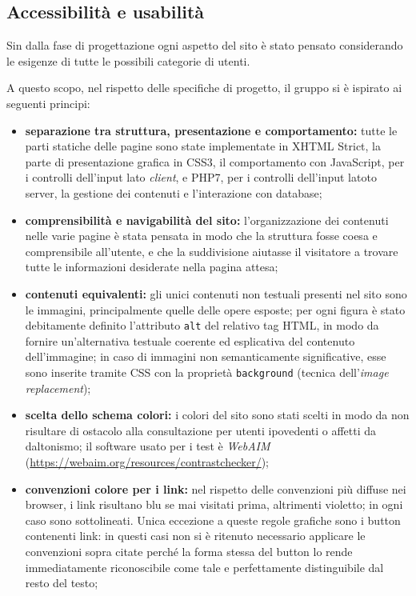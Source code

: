 \subsection{Accessibilità e usabilità}
\label{progettazione-accessibilità-usabilità}
Sin dalla fase di progettazione ogni aspetto del sito è stato pensato considerando le esigenze di tutte le possibili categorie di utenti. 


A questo scopo, nel rispetto delle specifiche di progetto, il gruppo si è ispirato ai seguenti principi:
\begin{itemize}
	\item \textbf{separazione tra struttura, presentazione e comportamento:} tutte le parti statiche delle pagine sono state implementate in XHTML Strict, la parte di presentazione grafica in CSS3, il comportamento con JavaScript, per i controlli dell'input lato \textit{client}, e PHP7, per i controlli dell'input latoto server, la gestione dei contenuti e l'interazione con database;
	
	\item \textbf{comprensibilità e navigabilità del sito:} l'organizzazione dei contenuti nelle varie pagine è stata pensata in modo che la struttura fosse coesa e comprensibile all'utente, e che la suddivisione aiutasse il visitatore a trovare tutte le informazioni desiderate nella pagina attesa;
	
	\item \textbf{contenuti equivalenti:} gli unici contenuti non testuali presenti nel sito sono le immagini, principalmente quelle delle opere esposte; per ogni figura è stato debitamente definito l'attributo \texttt{alt} del relativo tag HTML, in modo da fornire un'alternativa testuale coerente ed esplicativa del contenuto dell'immagine; in caso di immagini non semanticamente significative, esse sono inserite tramite CSS con la proprietà \texttt{background} (tecnica dell'\textit{image replacement});
	
	\item \textbf{scelta dello schema colori:} i colori del sito sono stati scelti in modo da non risultare di ostacolo alla consultazione per utenti ipovedenti o affetti da daltonismo; il software usato per i test è \textit{WebAIM} (\url{https://webaim.org/resources/contrastchecker/}); 
	
	\item \textbf{convenzioni colore per i link:} nel rispetto delle convenzioni più diffuse nei browser, i link risultano blu se mai visitati prima, altrimenti violetto; in ogni caso sono sottolineati. Unica eccezione a queste regole grafiche sono i button contenenti link: in questi casi non si è ritenuto necessario applicare le convenzioni sopra citate perché la forma stessa del button lo rende immediatamente riconoscibile come tale e perfettamente distinguibile dal resto del testo;
	

\end{itemize}
